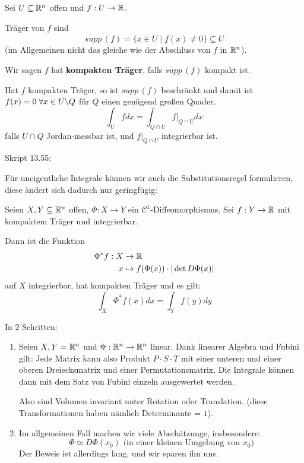 \documentclass[main.tex]{subfiles}
\begin{document}
\begin{Definition}
  Sei $U \subseteq \mathbb{R}^n$ offen und $f: U \to \mathbb{R}$.

  Träger von $f$ sind
  $$supp \, (f) = \overline{\{x \in U \mid f(x) \neq 0\}} \subseteq U$$
  (im Allgemeinen nicht das gleiche wie der Abschluss von $f$ in $\mathbb{R}^n$).

  Wir sagen $f$ hat \textbf{kompakten Träger}, falls $supp \, (f)$ kompakt ist.

  Hat $f$ kompakten Träger, so ist $supp \, (f)$ beschränkt und damit ist $f(x) = 0 \;\forall x \in U \backslash Q$ für $Q$ einen genügend großen Quader.
  $$\int_U fdx = \int_{Q \cap U} f|_{Q \cap U} dx$$
  falls $U \cap Q$ Jordan-messbar ist, und $f|_{Q \cap U}$ integrierbar ist.
\end{Definition}

Skript 13.55:

Für uneigentliche Integrale können wir auch die Substitutionsregel formulieren, diese ändert sich dadurch nur geringfügig:

\begin{Theorem}[Substitutionsregel]
  Seien $X,Y \subseteq \mathbb{R}^n$ offen, $\Phi : X \to Y$ ein $\mathcal{C}^1$-Diffeomorphismus. Sei $f:Y \to \mathbb{R}$ mit kompaktem Träger und integrierbar.

  Dann ist die Funktion
  $$\begin{aligned}
    \Phi^* f : X & \to \mathbb{R} \\
    x & \mapsto f(\Phi(x)) \cdot |\det D\Phi (x)|
  \end{aligned}$$
  auf $X$ integrierbar, hat kompakten Träger und es gilt:
  $$\int_X \Phi^* f(x) dx = \int_Y f(y)dy$$
\end{Theorem}

\begin{Beweis}
  In 2 Schritten:
  \begin{enumerate}
    \item Seien $X,Y = \mathbb{R}^n$ und $\Phi: \mathbb{R}^n \to \mathbb{R}^n$ linear. Dank linearer Algebra und Fubini gilt:
      Jede Matrix kann also Produkt $P \cdot S \cdot T$ mit einer unteren und einer oberen Dreiecksmatrix und einer Permutationsmatrix. Die Integrale können dann mit dem Satz von Fubini einzeln ausgewertet werden.

      Also sind Volumen invariant unter Rotation oder Translation. (diese Transformationen haben nämlich Determinante = $1$).
    \item Im allgemeinen Fall machen wir viele Abschätzunge, insbesondere:
      $$\Phi \simeq D \Phi(x_0) \text{ (in einer kleinen Umgebung von $x_0$)}$$
      Der Beweis ist allerdings lang, und wir sparen ihn uns.
  \end{enumerate}
\end{Beweis}
\end{document}
